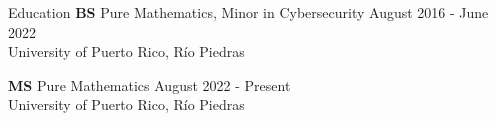 \documentclass{resume} %
\begin{document}
\begin{rSection}{Education}
    \textbf{BS} \hspace*{10mm} Pure Mathematics, Minor in Cybersecurity
    \hfill{August 2016 - June 2022} \\
     \hspace*{17mm} University of Puerto Rico, R\'io Piedras

    \textbf{MS} \hspace*{10mm} Pure Mathematics
    \hfill{August 2022 - Present} \\
     \hspace*{17mm} University of Puerto Rico, R\'io Piedras
\end{rSection}


\end{document}
